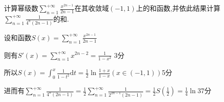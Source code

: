 \documentclass{NBUTExam}
\newcommand{\dis}{\displaystyle}
\begin{document}
\begin{problem}
计算幂级数$\dis \sum_{n=1}^{+\infty}{\frac{x^{2n-1}}{2n-1}}$在其收敛域$(-1,1)$上的和函数,并依此结果计算$\dis \sum_{n=1}^{+\infty}{\frac{1}{4^n\left( 2n-1 \right)}}$的和.
\end{problem}
\vspace{0.5em}

\begin{solution}
设和函数$\dis S(x) =\sum_{n=1}^{+\infty}{\frac{x^{2n-1}}{2n-1}}$
 \par
\vspace{0.5em}
则有$\dis S'(x) =\sum_{n=1}^{+\infty}{x^{2n-2}}=\frac{1}{1-x^2}$
\dotfill 3分 \par
\vspace{0.5em}
所以$\dis S(x) =\int_0^x{\frac{1}{1-t^2}}\mathrm{d}t=\frac{1}{2}\ln \frac{1+x}{1-x}\left(x\in(-1,1)\right)$\dotfill 5分 \par
\vspace{0.5em}
进而有$\dis \sum_{n=1}^{+\infty}{\frac{1}{4^n\left( 2n-1 \right)}}=\frac{1}{2}\sum_{n=1}^{+\infty}{\frac{1}{2^{2n-1}\left( 2n-1 \right)}}=\frac{1}{2}S\left( \frac{1}{2} \right) =\frac{1}{4}\ln 3$\dotfill 7分 \par
\vspace{0.5em}
\end{solution}
\vspace{2em}
\end{document}
